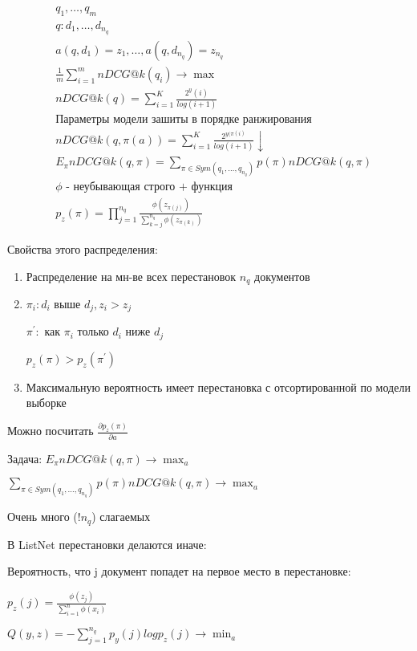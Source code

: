 \documentclass[a4paper, 12pt]{article}
\begin{document}
\begin{enumerate}
    \begin{align*}
        & q_1, \ldots, q_m \\
        & q: d_1, \ldots, d_{n_q} \\
        & a(q, d_1) = z_1, \ldots, a(q, d_{n_q}) = z_{n_q} \\
        & \frac{1}{m} \sum_{i = 1}^m nDCG@k(q_i) \rightarrow \max \\
        & nDCG@k(q) = \sum_{i = 1}^K \frac{2^y(i)}{log(i + 1)} \\
        & \textrm{Параметры модели зашиты в порядке ранжирования} \\
        & nDCG@k(q, \pi(a)) = \sum_{i = 1}^K \frac{2^{y(\pi(i)}}{log(i + 1)} \downarrow\\
        & E_{\pi}nDCG@k(q, \pi) = \sum_{\pi 
        \in Sym(q_1, \ldots, q_{n_q})}
        p(\pi)nDCG@k(q, \pi) \\
        & \phi \textrm{ - неубывающая строго + функция} \\
        & p_z(\pi) = \prod_{j = 1}^{n_q} \frac{\phi(z_{\pi(j)})}
        {\sum_{k = j}^{n_q}\phi(z_{\pi(k)})}
    \end{align*}
    
    Свойства этого распределения:

    \begin{enumerate}
        \item Распределение на мн-ве всех перестановок $n_q$
        документов
        \item 
        $\pi_i: d_i$ выше $d_j, z_i > z_j$
        
        $\pi^{\prime}:$ как $\pi_i$ только $d_i$ ниже $d_j$
        
        $p_z(\pi) > p_z(\pi^{\prime})$

        \item Максимальную вероятность имеет перестановка 
        с отсортированной по модели выборке
    \end{enumerate}

    Можно посчитать $\frac{\partial p_z(\pi)}{\partial a}$

    Задача: $E_{\pi}nDCG@k(q, \pi) \rightarrow \max_{a}$

    $\sum_{\pi 
    \in Sym(q_1, \ldots, q_{n_q})}
    p(\pi)nDCG@k(q, \pi) \rightarrow \max_a$

    Очень много ($!n_q$) слагаемых

    В ListNet перестановки делаются иначе:

    Вероятность, что j документ попадет на 
    первое место в перестановке:

    $p_z(j) = \frac{\phi(z_j)}{\sum_{i = 1}^n \phi(x_i)}$

    $Q(y, z) = - \sum_{j = 1}^{n_q}p_y(j)logp_z(j) \rightarrow \min_a$
\end{enumerate}
\end{document}
